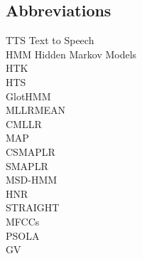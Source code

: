 \documentclass[english,12pt,a4paper,pdftex]{article}
\begin{document}
\subsection*{Abbreviations}
TTS Text to Speech \\
HMM Hidden Markov Models \\
HTK \\
HTS \\
GlotHMM \\
MLLRMEAN \\
CMLLR \\
MAP \\
CSMAPLR \\
SMAPLR \\
MSD-HMM\\
HNR\\
STRAIGHT\\
MFCCs\\
PSOLA\\
GV\\
\cleardoublepage
\storeinipagenumber
{}
\setcounter{page}{1}




\thispagestyle{empty}

\clearpage
%








\clearpage





\appendix 
\clearpage


\renewcommand{\theequation}{A\arabic{equation}}
\setcounter{equation}{0}  
\renewcommand{\thefigure}{A\arabic{figure}}
\setcounter{figure}{0}
\renewcommand{\thetable}{A\arabic{table}}
\setcounter{table}{0}
\end{document}
